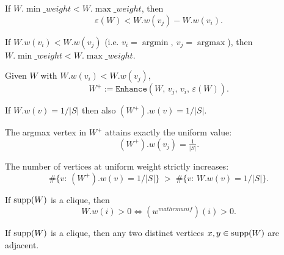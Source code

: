 \begin{lemma}\label{lem:eps-lt-gap}
If \(W.\min\_weight < W.\max\_weight\), then
\[
  \varepsilon(W) < W.w(v_j) - W.w(v_i).
\]
\leanok
\end{lemma}

\begin{lemma}\label{lem:arg-help}
If \(W.w(v_i) < W.w(v_j)\) (i.e. \(v_i=\operatorname{argmin},\ v_j=\operatorname{argmax}\)), then
\(W.\min\_weight < W.\max\_weight\).
\leanok
\end{lemma}

\begin{definition}\label{def:Enhanced}
Given \(W\) with \(W.w(v_i) < W.w(v_j)\),
\[
  W^+ := \texttt{Enhance}(W,\, v_j,\, v_i,\, \varepsilon(W)).
\]
\leanok
\end{definition}

\begin{lemma}\label{lem:Enhanced-unaffected}
If \(W.w(v)=1/|S|\) then also
\((W^+).w(v)=1/|S|\).
\leanok
\end{lemma}

\begin{lemma}\label{lem:Enhanced-argmax}
The argmax vertex in \(W^+\) attains exactly the uniform value:
\[
  (W^+).w(v_j) = \tfrac{1}{|S|}.
\]
\leanok
\end{lemma}

\begin{lemma}\label{lem:Enhanced-inc-uniform}
The number of vertices at uniform weight strictly increases:
\[
  \#\{v:\, (W^+).w(v)=1/|S|\} \;>\; \#\{v:\, W.w(v)=1/|S|\}.
\]
\leanok
\end{lemma}

\begin{lemma}\label{lem:UniformBetter-support}
If \(\operatorname{supp}(W)\) is a clique, then
\[
  W.w(i)>0 \iff (w^{mathrm{unif}})(i)>0.
\]
\leanok
\end{lemma}

\begin{lemma}\label{lem:support-clique}
If \(\operatorname{supp}(W)\) is a clique, then any two distinct vertices
\(x,y\in\operatorname{supp}(W)\) are adjacent.
\leanok
\end{lemma}

